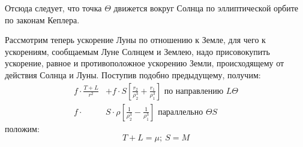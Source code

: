 \documentclass[a4paper,12pt]{article}
\begin{document}
Отсюда следует, что точка $\Theta$ движется вокруг Солнца по эллиптической орбите по законам Кеплера.

Рассмотрим теперь ускорение Луны по отношению к Земле, для чего к ускорениям, сообщаемым Луне Солнцем и Землею, надо присовокупить ускорение, равное и противоположное ускорению Земли, происходящему от действия Солнца и Луны. Поступив подобно предыдущему, получим:
\[
\begin{aligned}
	f \cdot \frac{T + L}{r^2} & + f \cdot S \left[ \frac{r_2}{\rho_2^3}  + \frac{r_1}{\rho_1^3} \right] \text{ по направлению } L \Theta  \\	
	f \cdot & S \cdot \rho \left[ \frac{1}{\rho_2^3} - \frac{1}{\rho_1^3} \right] \text{ параллельно } \Theta S
\end{aligned}
\]
положим:
\[
	T + L = \mu; ~ S = M
\]

\newpage

\listoftables

\listoffigures
\end{document}
